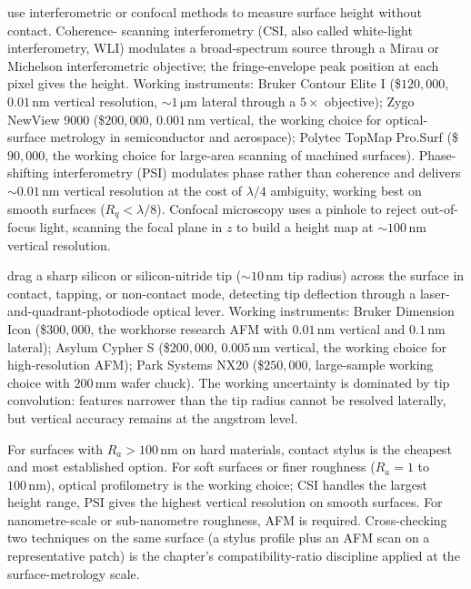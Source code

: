  use interferometric or confocal
methods to measure surface height without contact. Coherence-
scanning interferometry (CSI, also called white-light
interferometry, WLI) modulates a broad-spectrum source through a
Mirau or Michelson interferometric objective; the fringe-envelope
peak position at each pixel gives the height. Working instruments:
Bruker Contour Elite I (\$$120{,}000$, $0.01\,\si{\nano\meter}$
vertical resolution, $\sim 1\,\si{\micro\meter}$ lateral
through a $5\times$ objective); Zygo NewView 9000 (\$$200{,}000$,
$0.001\,\si{\nano\meter}$ vertical, the working choice for
optical-surface metrology in semiconductor and aerospace);
Polytec TopMap Pro.Surf (\$$90{,}000$, the working choice for
large-area scanning of machined surfaces). Phase-shifting
interferometry (PSI) modulates phase rather than coherence and
delivers $\sim 0.01\,\si{\nano\meter}$ vertical resolution at
the cost of $\lambda/4$ ambiguity, working best on smooth
surfaces ($R_{q} < \lambda/8$). Confocal microscopy uses a
pinhole to reject out-of-focus light, scanning the focal plane in
$z$ to build a height map at $\sim 100\,\si{\nano\meter}$
vertical resolution.

 drag a sharp silicon
or silicon-nitride tip ($\sim 10\,\si{\nano\meter}$ tip radius)
across the surface in contact, tapping, or non-contact mode,
detecting tip deflection through a laser-and-quadrant-photodiode
optical lever. Working instruments: Bruker Dimension Icon
(\$$300{,}000$, the workhorse research AFM with $0.01\,\si{\nano
\meter}$ vertical and $0.1\,\si{\nano\meter}$ lateral); Asylum
Cypher S (\$$200{,}000$, $0.005\,\si{\nano\meter}$ vertical, the
working choice for high-resolution AFM); Park Systems NX20
(\$$250{,}000$, large-sample working choice with $200\,\si{
\milli\meter}$ wafer chuck). The working uncertainty is
dominated by tip convolution: features narrower than the tip
radius cannot be resolved laterally, but vertical accuracy
remains at the angstrom level.

 For surfaces with
$R_{a} > 100\,\si{\nano\meter}$ on hard materials, contact stylus
is the cheapest and most established option. For soft surfaces or
finer roughness ($R_{a} = 1$ to $100\,\si{\nano\meter}$), optical
profilometry is the working choice; CSI handles the largest
height range, PSI gives the highest vertical resolution on
smooth surfaces. For nanometre-scale or sub-nanometre roughness,
AFM is required. Cross-checking two techniques on the same
surface (a stylus profile plus an AFM scan on a representative
patch) is the chapter's compatibility-ratio discipline applied
at the surface-metrology scale.

